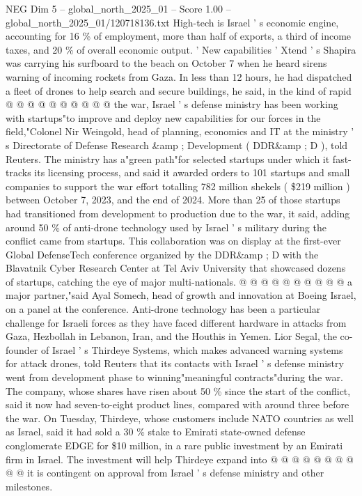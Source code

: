 \begin{textsample}{NEG Dim 5 – global\_north\_2025\_01 – Score 1.00 – global\_north\_2025\_01/120718136.txt}
High-tech is Israel ' s economic engine, accounting for 16 \% of employment, more than half of exports, a third of income taxes, and 20 \% of overall economic output. ' New capabilities ' Xtend ' s Shapira was carrying his surfboard to the beach on October 7 when he heard sirens warning of incoming rockets from Gaza.
In less than 12 hours, he had dispatched a fleet of drones to help search and secure buildings, he said, in the kind of rapid @ @ @ @ @ @ @ @ @ @ the war, Israel ' s defense ministry has been working with startups"to improve and deploy new capabilities for our forces in the field,"Colonel Nir Weingold, head of planning, economics and IT at the ministry ' s Directorate of Defense Research \&amp ; Development ( DDR\&amp ; D ), told Reuters.
The ministry has a"green path"for selected startups under which it fast-tracks its licensing process, and said it awarded orders to 101 startups and small companies to support the war effort totalling 782 million shekels ( \$219 million ) between October 7, 2023, and the end of 2024.
More than 25 of those startups had transitioned from development to production due to the war, it said, adding around 50 \% of anti-drone technology used by Israel ' s military during the conflict came from startups.
This collaboration was on display at the first-ever Global DefenseTech conference organized by the DDR\&amp ; D with the Blavatnik Cyber Research Center at Tel Aviv University that showcased dozens of startups, catching the eye of major multi-nationals. @ @ @ @ @ @ @ @ @ @ a major partner,"said Ayal Somech, head of growth and innovation at Boeing Israel, on a panel at the conference.
Anti-drone technology has been a particular challenge for Israeli forces as they have faced different hardware in attacks from Gaza, Hezbollah in Lebanon, Iran, and the Houthis in Yemen.
Lior Segal, the co-founder of Israel ' s Thirdeye Systems, which makes advanced warning systems for attack drones, told Reuters that its contacts with Israel ' s defense ministry went from development phase to winning"meaningful contracts"during the war.
The company, whose shares have risen about 50 \% since the start of the conflict, said it now had seven-to-eight product lines, compared with around three before the war.
On Tuesday, Thirdeye, whose customers include NATO countries as well as Israel, said it had sold a 30 \% stake to Emirati state-owned defense conglomerate EDGE for \$10 million, in a rare public investment by an Emirati firm in Israel.
The investment will help Thirdeye expand into @ @ @ @ @ @ @ @ @ @ it is contingent on approval from Israel ' s defense ministry and other milestones.

\end{textsample}
